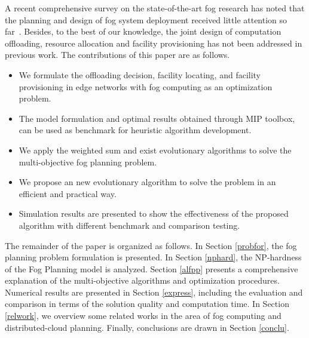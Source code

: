 \documentclass[10pt,journal,compsoc]{IEEEtran}
\begin{document}




A recent comprehensive survey on the state-of-the-art fog research has noted that the planning and design of fog system deployment received little attention so far~\cite{mouradian2017comprehensive}. Besides, to the best of our knowledge, the joint design of computation offloading, resource allocation and facility provisioning has not been addressed in previous work. The contributions of this paper are as follows.
\begin{itemize}
\item We formulate the offloading decision, facility locating, and facility provisioning in edge networks with fog computing as an optimization problem.
\item The model formulation and optimal results obtained through MIP toolbox, can be used as benchmark for heuristic algorithm development.
\item We apply the weighted sum and exist evolutionary algorithms to solve  the multi-objective fog planning problem.
\item We propose an new evolutionary algorithm to solve the problem in an efficient and practical way.
\item Simulation results are presented to show the effectiveness of the proposed algorithm with different benchmark and comparison testing.
\end{itemize}



The remainder of the paper is organized as follows. In Section \ref{probfor}, the fog planning problem formulation is presented. In Section \ref{nphard}, the NP-hardness of the Fog Planning model is analyzed. Section \ref{alfpp} presents a comprehensive explanation of the multi-objective algorithms and optimization procedures. 
Numerical results are presented in Section \ref{express}, including the evaluation and comparison in terms of the solution quality and computation time. In Section \ref{relwork}, we overview some related works in the area of fog computing and distributed-cloud planning. Finally, conclusions are drawn in Section \ref{conclu}.
\end{document}
